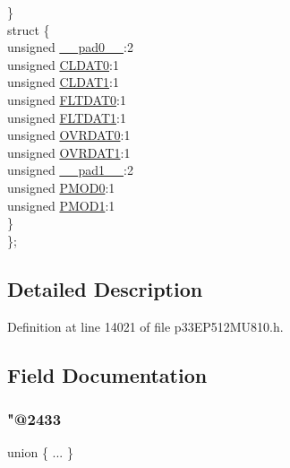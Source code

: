 \begin{DoxyCompactItemize}
\begin{tabbing}
\>\} \\
\>struct \{\\
\>\>unsigned \hyperlink{structtag_i_o_c_o_n1_b_i_t_s_adf71f3d8410c1f1dbbc96680a92c49af}{\_\_pad0\_\_}:2\\
\>\>unsigned \hyperlink{structtag_i_o_c_o_n1_b_i_t_s_a524fe5d7c4f19a9e5bab6fdae8cb6113}{CLDAT0}:1\\
\>\>unsigned \hyperlink{structtag_i_o_c_o_n1_b_i_t_s_abd730465de1cbb6fd169fef4c9f97b9e}{CLDAT1}:1\\
\>\>unsigned \hyperlink{structtag_i_o_c_o_n1_b_i_t_s_a154c32b551ecc420f476def330e87abd}{FLTDAT0}:1\\
\>\>unsigned \hyperlink{structtag_i_o_c_o_n1_b_i_t_s_a76d169f1247080fb508c7b31f62e89ab}{FLTDAT1}:1\\
\>\>unsigned \hyperlink{structtag_i_o_c_o_n1_b_i_t_s_a45d53d0768dd2659f98447ad77cc91b1}{OVRDAT0}:1\\
\>\>unsigned \hyperlink{structtag_i_o_c_o_n1_b_i_t_s_a095c02d71ec41de4ed9985a86207253f}{OVRDAT1}:1\\
\>\>unsigned \hyperlink{structtag_i_o_c_o_n1_b_i_t_s_acaf2d0924a107ec6e8d2e31febaf66f9}{\_\_pad1\_\_}:2\\
\>\>unsigned \hyperlink{structtag_i_o_c_o_n1_b_i_t_s_ac125b1e88bd44f7f044dcb0185cfb781}{PMOD0}:1\\
\>\>unsigned \hyperlink{structtag_i_o_c_o_n1_b_i_t_s_a961c1af920bb390a3b4ff925e45fa059}{PMOD1}:1\\
\>\} \\
\}; \\

\end{tabbing}\end{DoxyCompactItemize}


\subsection{Detailed Description}


Definition at line 14021 of file p33\+E\+P512\+M\+U810.\+h.



\subsection{Field Documentation}
\mbox{\label{structtag_i_o_c_o_n1_b_i_t_s_ae1bbd4bb2bc7516eff98b4a8ea47d313}} 
\subsubsection{\texorpdfstring{"@2433}{@2433}}
{\footnotesize\ttfamily union \{ ... \} }

